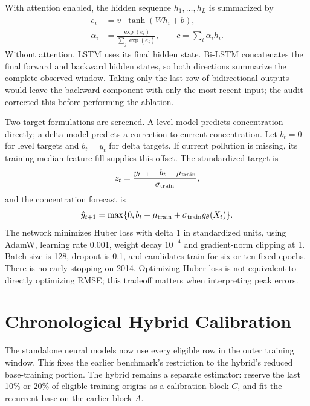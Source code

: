 \documentclass[conference]{IEEEtran}
\begin{document}
With attention enabled, the hidden sequence $h_1,\ldots,h_L$ is summarized by
\begin{align}
e_i &= v^\top\tanh(Wh_i+b),\\
\alpha_i &= \frac{\exp(e_i)}{\sum_j\exp(e_j)},\qquad
c = \sum_i \alpha_i h_i.
\end{align}
Without attention, LSTM uses its final hidden state. Bi-LSTM concatenates the final forward and backward hidden states, so both directions summarize the complete observed window. Taking only the last row of bidirectional outputs would leave the backward component with only the most recent input; the audit corrected this before performing the ablation.

Two target formulations are screened. A level model predicts concentration directly; a delta model predicts a correction to current concentration. Let $b_t=0$ for level targets and $b_t=y_t$ for delta targets. If current pollution is missing, its training-median feature fill supplies this offset. The standardized target is
\begin{equation}
z_t=\frac{y_{t+1}-b_t-\mu_{\rm train}}{\sigma_{\rm train}},
\end{equation}
and the concentration forecast is
\begin{equation}
\hat y_{t+1}=\max\{0,b_t+\mu_{\rm train}+\sigma_{\rm train}g_\theta(X_t)\}.
\end{equation}
The network minimizes Huber loss with delta 1 in standardized units, using AdamW, learning rate 0.001, weight decay $10^{-4}$ and gradient-norm clipping at 1. Batch size is 128, dropout is 0.1, and candidates train for six or ten fixed epochs. There is no early stopping on 2014. Optimizing Huber loss is not equivalent to directly optimizing RMSE; this tradeoff matters when interpreting peak errors.

\section{Chronological Hybrid Calibration}
The standalone neural models now use every eligible row in the outer training window. This fixes the earlier benchmark's restriction to the hybrid's reduced base-training portion. The hybrid remains a separate estimator: reserve the last 10\% or 20\% of eligible training origins as a calibration block $C$, and fit the recurrent base on the earlier block $A$.
\end{document}

